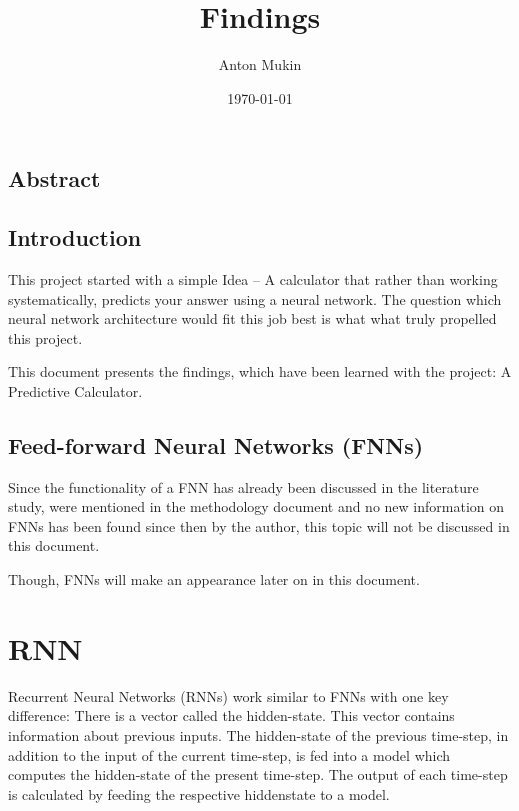 \documentclass{article}
\title{Findings}
\author{Anton Mukin}
\date{\today}
\begin{document}
\maketitle

\subsection{Abstract}

\subsection{Introduction}
This project started with a simple Idea -- A calculator that rather than 
working systematically, predicts your answer using a neural network. The 
question which neural network architecture would fit this job best is what 
what truly propelled this project.

This document presents the findings, which have been learned with the 
project: A Predictive Calculator.

\subsection{Feed-forward Neural Networks (FNNs)}
Since the functionality of a FNN has already been discussed in the 
literature study, were mentioned in the methodology document and no new 
information on FNNs has been found since then by the author, this topic 
will not be discussed in this document. 

Though, FNNs will make an appearance later on in this document.

\newpage
\tableofcontents
\newpage

\section{RNN}

Recurrent Neural Networks (RNNs) work similar to FNNs with one key 
difference: There is a vector called the hidden-state. This vector contains 
information about previous inputs. The hidden-state of the previous 
time-step, in addition to the input of the current time-step, is fed into a 
model which computes the hidden-state of the present time-step. The output 
of each time-step is calculated by feeding the respective hiddenstate to a 
model.
\end{document}
